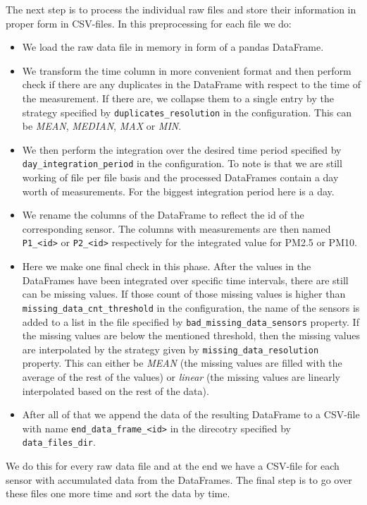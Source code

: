\documentclass[12pt,a4paper,twoside]{scrartcl}
\numberwithin{equation}{section}
\begin{document}
The next step is to process the individual raw files and store their information in proper form in CSV-files. In this preprocessing for each file we do:
\begin{itemize}
\item We load the raw data file in memory in form of a pandas DataFrame.
\item We transform the time column in more convenient format and then perform check if there are any duplicates in the DataFrame with respect to the time of the measurement. If there are, we collapse them to a single entry by the strategy specified by \texttt{duplicates\_resolution} in the configuration. This can be \emph{MEAN}, \emph{MEDIAN}, \emph{MAX} or \emph{MIN}.
\item We then perform the integration over the desired time period specified by \texttt{day\_integration\_period} in the configuration. To note is that we are still working of file per file basis and the processed DataFrames contain a day worth of measurements. For the biggest integration period here is a day.
\item We rename the columns of the DataFrame to reflect the id of the corresponding sensor. The columns with measurements are then named \texttt{P1\_<id>} or \texttt{P2\_<id>} respectively for the integrated value for PM2.5 or PM10.
\item Here we make one final check in this phase. After the values in the DataFrames have been integrated over specific time intervals, there are still can be missing values. If those count of those missing values is higher than \texttt{missing\_data\_cnt\_threshold} in the configuration, the name of the sensors is added to a list in the file specified by \texttt{bad\_missing\_data\_sensors} property. If the missing values are below the mentioned threshold, then the missing values are interpolated by the strategy given by \texttt{missing\_data\_resolution} property. This can either be \emph{MEAN} (the missing values are filled with the average of the rest of the values) or \emph{linear} (the missing values are linearly interpolated based on the rest of the data).
\item After all of that we append the data of the resulting DataFrame to a CSV-file with name \texttt{end\_data\_frame\_<id>} in the direcotry specified by \texttt{data\_files\_dir}.
\end{itemize}
We do this for every raw data file and at the end we have a CSV-file for each sensor with accumulated data from the DataFrames. The final step is to go over these files one more time and sort the data by time.
\end{document}
